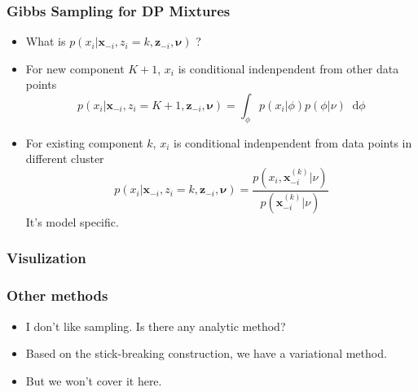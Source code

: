 \documentclass{beamer}
\newcommand*\diff{\mathop{}\!\mathrm{d}}
\begin{document}
\begin{frame}
	\frametitle{Gibbs Sampling for DP Mixtures}
	\begin{itemize}
		\item What is $p(x_i|\bm{x}_{-i}, z_i=k, \bm{z}_{-i}, \bm{\nu})$ ?
		\item For new component $K+1$, $x_i$ is conditional indenpendent from other data points
		\[
		p(x_i|\bm{x}_{-i}, z_i=K+1, \bm{z}_{-i}, \bm{\nu})
		= \int_{\phi} p(x_i|\phi)p(\phi | \nu) \diff \phi
		\]
		\item For existing component $k$, $x_i$ is conditional indenpendent from data points in different cluster
		\[
		p(x_i|\bm{x}_{-i}, z_i=k, \bm{z}_{-i}, \bm{\nu})
		= \frac{p(x_i, \bm{x}_{-i}^{(k)}|\nu)}{p(\bm{x}_{-i}^{(k)}|\nu)}
		\]		
		It's model specific.
	\end{itemize}
\end{frame}
\begin{frame}
	\frametitle{Visulization}
\end{frame}
\begin{frame}
	\frametitle{Other methods}
	\begin{itemize}
		\item I don't like sampling. Is there any analytic method?
		\item Based on the stick-breaking construction, we have a variational method.
		\item But we won't cover it here.
	\end{itemize}
\end{frame}
\end{document}
